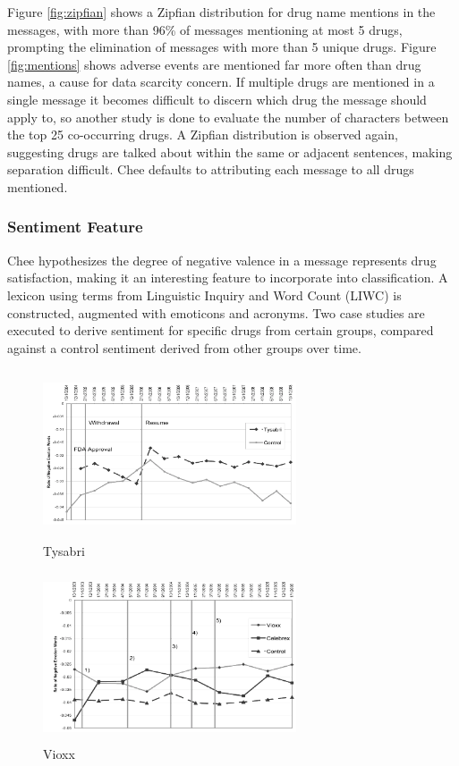 \documentclass[twoside,11pt]{article}
\begin{document}
Figure \ref{fig:zipfian} shows a Zipfian distribution for drug name mentions in the messages, with more than 96\% of messages mentioning at most 5 drugs, prompting the elimination of messages with more than 5 unique drugs. Figure \ref{fig:mentions} shows adverse events are mentioned far more often than drug names, a cause for data scarcity concern. If multiple drugs are mentioned in a single message it becomes difficult to discern which drug the message should apply to, so another study is done to evaluate the number of characters between the top 25 co-occurring drugs. A Zipfian distribution is observed again, suggesting drugs are talked about within the same or adjacent sentences, making separation difficult. Chee defaults to attributing each message to all drugs mentioned.

\subsubsection{Sentiment Feature}
Chee hypothesizes the degree of negative valence in a message represents drug satisfaction, making it an interesting feature to incorporate into classification. A lexicon using terms from Linguistic Inquiry and Word Count (LIWC) is constructed, augmented with emoticons and acronyms. Two case studies are executed to derive sentiment for specific drugs from certain groups, compared against a control sentiment derived from other groups over time.

\hspace{-1cm}\begin{minipage}{.5\textwidth}
  \begin{figure}[H]
    \caption{Tysabri}
    \label{fig:tysabri}
    \includegraphics[width=7.5cm, height=5cm]{Figure-3-Tysabri.png}
  \end{figure}
\end{minipage}%
\hspace{.25cm}\begin{minipage}{.5\textwidth}
  \begin{figure}[H]
    \caption{Vioxx}
    \label{fig:vioxx}
    \includegraphics[width=7.5cm, height=5cm]{Figure-4-Vioxx.png}
  \end{figure}
\end{minipage}
\end{document}
